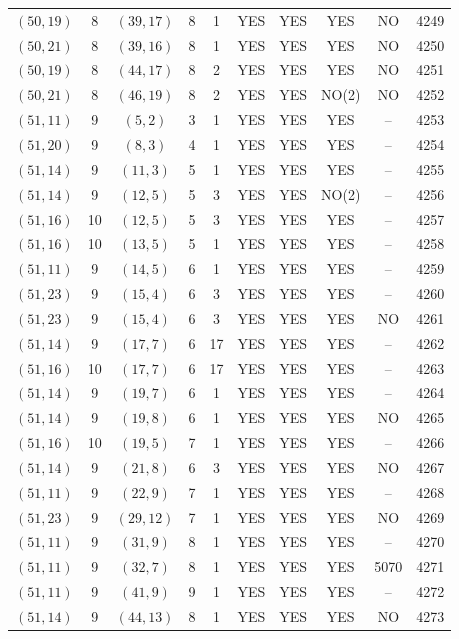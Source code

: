 \begin{longtable}{|c|c|c|c|c|c|c|c|c|c|}
$(50, 19)$ & 8 & $(39, 17)$ & 8 & 1 & YES & YES & YES & NO & 4249\\
$(50, 21)$ & 8 & $(39, 16)$ & 8 & 1 & YES & YES & YES & NO & 4250\\
$(50, 19)$ & 8 & $(44, 17)$ & 8 & 2 & YES & YES & YES & NO & 4251\\
$(50, 21)$ & 8 & $(46, 19)$ & 8 & 2 & YES & YES & NO(2) & NO & 4252\\
$(51, 11)$ & 9 & $(5, 2)$ & 3 & 1 & YES & YES & YES & -- & 4253\\
$(51, 20)$ & 9 & $(8, 3)$ & 4 & 1 & YES & YES & YES & -- & 4254\\
$(51, 14)$ & 9 & $(11, 3)$ & 5 & 1 & YES & YES & YES & -- & 4255\\
$(51, 14)$ & 9 & $(12, 5)$ & 5 & 3 & YES & YES & NO(2) & -- & 4256\\
$(51, 16)$ & 10 & $(12, 5)$ & 5 & 3 & YES & YES & YES & -- & 4257\\
$(51, 16)$ & 10 & $(13, 5)$ & 5 & 1 & YES & YES & YES & -- & 4258\\
$(51, 11)$ & 9 & $(14, 5)$ & 6 & 1 & YES & YES & YES & -- & 4259\\
$(51, 23)$ & 9 & $(15, 4)$ & 6 & 3 & YES & YES & YES & -- & 4260\\
$(51, 23)$ & 9 & $(15, 4)$ & 6 & 3 & YES & YES & YES & NO & 4261\\
$(51, 14)$ & 9 & $(17, 7)$ & 6 & 17 & YES & YES & YES & -- & 4262\\
$(51, 16)$ & 10 & $(17, 7)$ & 6 & 17 & YES & YES & YES & -- & 4263\\
$(51, 14)$ & 9 & $(19, 7)$ & 6 & 1 & YES & YES & YES & -- & 4264\\
$(51, 14)$ & 9 & $(19, 8)$ & 6 & 1 & YES & YES & YES & NO & 4265\\
$(51, 16)$ & 10 & $(19, 5)$ & 7 & 1 & YES & YES & YES & -- & 4266\\
$(51, 14)$ & 9 & $(21, 8)$ & 6 & 3 & YES & YES & YES & NO & 4267\\
$(51, 11)$ & 9 & $(22, 9)$ & 7 & 1 & YES & YES & YES & -- & 4268\\
$(51, 23)$ & 9 & $(29, 12)$ & 7 & 1 & YES & YES & YES & NO & 4269\\
$(51, 11)$ & 9 & $(31, 9)$ & 8 & 1 & YES & YES & YES & -- & 4270\\
$(51, 11)$ & 9 & $(32, 7)$ & 8 & 1 & YES & YES & YES & 5070 & 4271\\
$(51, 11)$ & 9 & $(41, 9)$ & 9 & 1 & YES & YES & YES & -- & 4272\\
$(51, 14)$ & 9 & $(44, 13)$ & 8 & 1 & YES & YES & YES & NO & 4273\\

\end{longtable}

